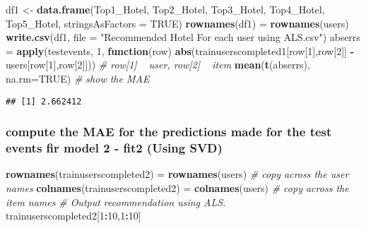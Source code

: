 \documentclass[]{article}
\newenvironment{Shaded}{\begin{snugshade}}{\end{snugshade}}
\newcommand{\CommentTok}[1]{\textcolor[rgb]{0.56,0.35,0.01}{\textit{#1}}}
\newcommand{\ControlFlowTok}[1]{\textcolor[rgb]{0.13,0.29,0.53}{\textbf{#1}}}
\newcommand{\DataTypeTok}[1]{\textcolor[rgb]{0.13,0.29,0.53}{#1}}
\newcommand{\DecValTok}[1]{\textcolor[rgb]{0.00,0.00,0.81}{#1}}
\newcommand{\KeywordTok}[1]{\textcolor[rgb]{0.13,0.29,0.53}{\textbf{#1}}}
\newcommand{\NormalTok}[1]{#1}
\newcommand{\OperatorTok}[1]{\textcolor[rgb]{0.81,0.36,0.00}{\textbf{#1}}}
\newcommand{\OtherTok}[1]{\textcolor[rgb]{0.56,0.35,0.01}{#1}}
\newcommand{\StringTok}[1]{\textcolor[rgb]{0.31,0.60,0.02}{#1}}
\begin{document}
\begin{Shaded}
\begin{Highlighting}[]
\NormalTok{df1 <-}\StringTok{ }\KeywordTok{data.frame}\NormalTok{(Top1_Hotel, Top2_Hotel, Top3_Hotel, Top4_Hotel, Top5_Hotel, }\DataTypeTok{stringsAsFactors =} \OtherTok{TRUE}\NormalTok{)}
\KeywordTok{rownames}\NormalTok{(df1) =}\StringTok{ }\KeywordTok{rownames}\NormalTok{(users)}
\KeywordTok{write.csv}\NormalTok{(df1, }\DataTypeTok{file =} \StringTok{"Recommended Hotel For each user using ALS.csv"}\NormalTok{)}
\NormalTok{abserrs =}\StringTok{ }\KeywordTok{apply}\NormalTok{(testevents, }\DecValTok{1}\NormalTok{, }\ControlFlowTok{function}\NormalTok{(row) }\KeywordTok{abs}\NormalTok{(trainuserscompleted1[row[}\DecValTok{1}\NormalTok{],row[}\DecValTok{2}\NormalTok{]] }\OperatorTok{-}\StringTok{ }\NormalTok{users[row[}\DecValTok{1}\NormalTok{],row[}\DecValTok{2}\NormalTok{]])) }\CommentTok{# row[1] ~ user, row[2] ~ item}
\KeywordTok{mean}\NormalTok{(}\KeywordTok{t}\NormalTok{(abserrs), }\DataTypeTok{na.rm=}\OtherTok{TRUE}\NormalTok{) }\CommentTok{# show the MAE}
\end{Highlighting}
\end{Shaded}

\begin{verbatim}
## [1] 2.662412
\end{verbatim}

\hypertarget{compute-the-mae-for-the-predictions-made-for-the-test-events-fir-model-2---fit2-using-svd}{%
\subsubsection{compute the MAE for the predictions made for the test
events fir model 2 - fit2 (Using
SVD)}\label{compute-the-mae-for-the-predictions-made-for-the-test-events-fir-model-2---fit2-using-svd}}

\begin{Shaded}
\begin{Highlighting}[]
\KeywordTok{rownames}\NormalTok{(trainuserscompleted2) =}\StringTok{ }\KeywordTok{rownames}\NormalTok{(users) }\CommentTok{# copy across the user names}
\KeywordTok{colnames}\NormalTok{(trainuserscompleted2) =}\StringTok{ }\KeywordTok{colnames}\NormalTok{(users) }\CommentTok{# copy across the item names}
\CommentTok{# Output recommendation using ALS.}
\NormalTok{trainuserscompleted2[}\DecValTok{1}\OperatorTok{:}\DecValTok{10}\NormalTok{,}\DecValTok{1}\OperatorTok{:}\DecValTok{10}\NormalTok{]}
\end{Highlighting}
\end{Shaded}
\end{document}
